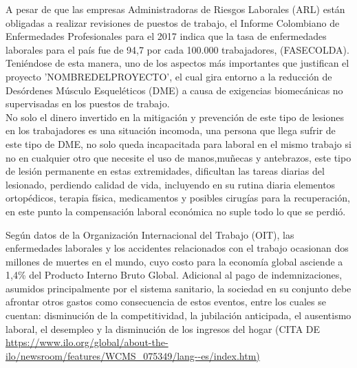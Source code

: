 A pesar de que las empresas Administradoras de Riesgos Laborales (ARL) están obligadas a realizar revisiones de puestos de trabajo, el Informe Colombiano de Enfermedades Profesionales para el 2017 indica que la tasa de enfermedades laborales para el país fue de 94,7 por cada 100.000 trabajadores, (FASECOLDA). Teniéndose de esta manera, uno de los aspectos más importantes que justifican el proyecto 'NOMBREDELPROYECTO', el cual gira entorno a la reducción de Desórdenes Músculo Esqueléticos (DME) a causa de exigencias biomecánicas no supervisadas en los puestos de trabajo.
\\
No solo el dinero invertido en la mitigación y prevención de este tipo de lesiones en los trabajadores es una situación incomoda,  una persona que llega sufrir de este tipo de DME, no solo queda incapacitada para laboral en el mismo trabajo si no en cualquier otro que necesite el uso de manos,muñecas y antebrazos, este tipo de lesión permanente en estas extremidades, dificultan las tareas diarias del lesionado, perdiendo calidad de vida, incluyendo en su rutina diaria elementos ortopédicos, terapia física, medicamentos y posibles cirugías para la recuperación, en este punto la compensación laboral económica no suple todo lo que se perdió. 

Según datos de la Organización Internacional del
Trabajo (OIT), las enfermedades laborales y los accidentes
relacionados con el trabajo ocasionan dos millones de
muertes en el mundo, cuyo costo para la economía global asciende
a 1,4\% del Producto Interno Bruto Global. Adicional al
pago de indemnizaciones, asumidos principalmente por el
sistema sanitario, la sociedad en su conjunto debe afrontar
otros gastos como consecuencia de estos eventos, entre
los cuales se cuentan: disminución de la competitividad, la
jubilación anticipada, el ausentismo laboral, el desempleo
y la disminución de los ingresos del hogar (CITA DE \url{https://www.ilo.org/global/about-the-ilo/newsroom/features/WCMS_075349/lang--es/index.htm)}



